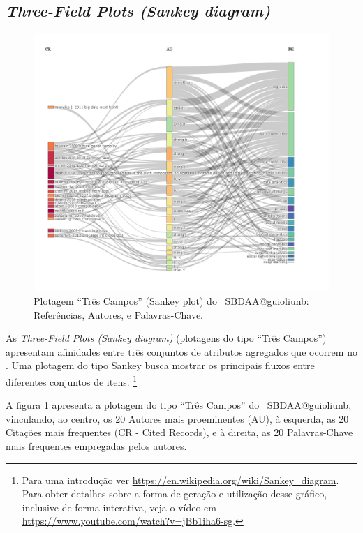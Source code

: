 \subsection{\textit{Three-Field Plots (Sankey diagram)} \label{SBDAA:Sankey}}

\begin{figure}
    \centering
    \includegraphics[angle=0,width=1\textwidth]{experiments/guioliunb/AnaliseBibliometrica/SocialBigDataAnalysis/3FSE-referencesXauthorsXkeywords.png}
    \caption{Plotagem ``Três Campos'' (Sankey plot) do \dataset\ SBDAA@guioliunb: Referências, Autores, e Palavras-Chave.}
    \label{fig:SBDAA@guioliunb:ThreeFieldPlot}
\end{figure}

As \textit{Three-Field Plots (Sankey diagram)} (plotagens do tipo ``Três Campos'') apresentam afinidades entre três conjuntos de atributos agregados que ocorrem no \dataset. Uma plotagem do tipo Sankey busca mostrar os principais fluxos entre diferentes conjuntos de itens. \footnote{Para uma introdução ver \url{https://en.wikipedia.org/wiki/Sankey_diagram}. Para obter detalhes sobre a forma de geração e utilização desse gráfico, inclusive de forma interativa, veja o vídeo em \url{https://www.youtube.com/watch?v=jBb1iha6-sg}.} 



A figura \ref{fig:SBDAA@guioliunb:ThreeFieldPlot} apresenta a plotagem do tipo ``Três Campos'' do \dataset\   SBDAA@guioliunb, vinculando, ao centro, os 20 Autores mais proeminentes (AU), à esquerda, as 20 Citações mais frequentes (CR - Cited Records), e à direita, as 20 Palavras-Chave mais frequentes empregadas pelos autores.

